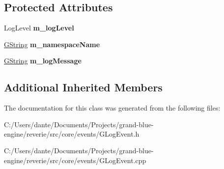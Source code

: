 \subsection*{Protected Attributes}
\begin{DoxyCompactItemize}
\item 
\mbox{\label{classrev_1_1_log_event_a239bdf93c4a95280143ec234f5a29d70}} 
Log\+Level {\bfseries m\+\_\+log\+Level}
\item 
\mbox{\label{classrev_1_1_log_event_ae5fe2a3838d9cd9e5abf465b328e4d4b}} 
\mbox{\hyperlink{classrev_1_1_g_string}{G\+String}} {\bfseries m\+\_\+namespace\+Name}
\item 
\mbox{\label{classrev_1_1_log_event_a8804cadd9f0160498834287b3b553852}} 
\mbox{\hyperlink{classrev_1_1_g_string}{G\+String}} {\bfseries m\+\_\+log\+Message}
\end{DoxyCompactItemize}
\subsection*{Additional Inherited Members}


The documentation for this class was generated from the following files\+:\begin{DoxyCompactItemize}
\item 
C\+:/\+Users/dante/\+Documents/\+Projects/grand-\/blue-\/engine/reverie/src/core/events/G\+Log\+Event.\+h\item 
C\+:/\+Users/dante/\+Documents/\+Projects/grand-\/blue-\/engine/reverie/src/core/events/G\+Log\+Event.\+cpp\end{DoxyCompactItemize}
